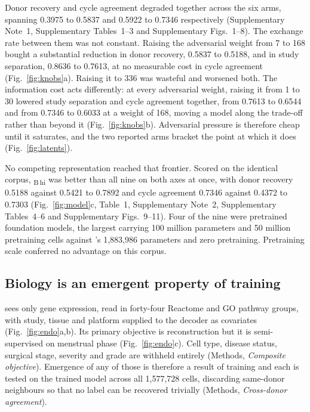 Donor recovery and cycle agreement degraded together across the six arms,
spanning 0.3975 to 0.5837 and 0.5922 to 0.7346 respectively (Supplementary Note~1,
Supplementary Tables~1--3 and Supplementary Figs.~1--8). The
exchange rate between them was not constant. Raising the adversarial weight
from 7 to 168 bought a substantial reduction in donor recovery, 0.5837 to
0.5188, and in study separation, 0.8636 to 0.7613, at no measurable cost in
cycle agreement (Fig.~\ref{fig:knobs}a). Raising it to 336 was wasteful and
worsened both. The information cost acts differently: at every adversarial
weight, raising it from 1 to 30 lowered study separation and cycle
agreement together, from 0.7613 to 0.6544 and from 0.7346 to 0.6033 at a
weight of 168, moving a model along the trade-off rather than beyond it
(Fig.~\ref{fig:knobs}b). Adversarial pressure is therefore cheap until it
saturates, and the two reported arms bracket the point at which it does
(Fig.~\ref{fig:latents}).

No competing representation reached that frontier. Scored on the identical
corpus, \elaj\textsubscript{B\,hi} was better than all nine on both axes at once, with
donor recovery 0.5188 against 0.5421 to 0.7892 and cycle agreement 0.7346
against 0.4372 to 0.7303 (Fig.~\ref{fig:model}c, Table~1, Supplementary Note~2,
Supplementary Tables~4--6 and Supplementary Figs.~9--11). Four of the nine were pretrained
foundation models, the largest carrying 100 million parameters and 50 million
pretraining cells \citep{hao2024scfoundation} against \elaj{}'s 1,883,986 
parameters and zero pretraining. Pretraining scale conferred no advantage 
on this corpus.

\subsection*{Biology is an emergent property of training}

\elaj{} sees only gene expression, read in forty-four Reactome and GO
pathway groups, with study, tissue and platform supplied to the decoder as
covariates (Fig.~\ref{fig:endo}a,b). Its primary objective is reconstruction but it is 
semi-supervised on menstrual phase (Fig.~\ref{fig:endo}c). Cell type, disease status, surgical stage, 
severity and grade are withheld entirely (Methods, \emph{Composite objective}). 
Emergence of any of those is therefore a result of training and each is tested on
the trained model across all 1,577,728 cells, discarding same-donor
neighbours so that no label can be recovered trivially (Methods, 
\emph{Cross-donor agreement}).

